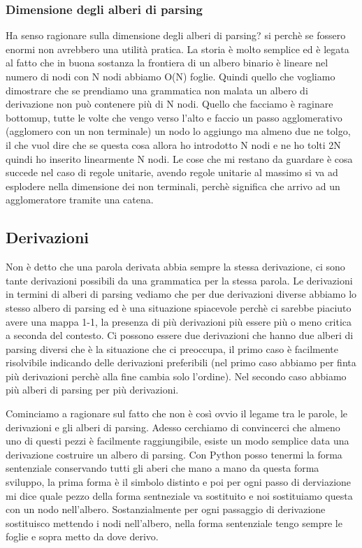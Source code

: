 \subsubsection{Dimensione degli alberi di parsing}
Ha senso ragionare sulla dimensione degli alberi di parsing? si perchè se fossero enormi non avrebbero una utilità pratica. La storia è molto semplice ed è legata al fatto che in buona sostanza la frontiera di un albero binario è lineare nel numero di nodi con N nodi abbiamo O(N) foglie. Quindi quello che vogliamo dimostrare che se prendiamo una grammatica non malata un albero di derivazione non può contenere più di N nodi.
Quello che facciamo è raginare bottomup, tutte le volte che vengo verso l'alto e faccio un passo agglomerativo (agglomero con un non terminale) un nodo lo aggiungo ma almeno due ne tolgo, il che vuol dire che se questa cosa allora ho introdotto N nodi e ne ho tolti 2N quindi ho inserito linearmente N nodi. Le cose che mi restano da guardare è cosa succede nel caso di regole unitarie, avendo regole unitarie al massimo si va ad esplodere nella dimensione dei non terminali, perchè significa che arrivo ad un agglomeratore tramite una catena.

\subsection{Derivazioni}
Non è detto che una parola derivata abbia sempre la stessa derivazione, ci sono tante derivazioni possibili da una grammatica per la stessa parola. Le derivazioni in termini di alberi di parsing vediamo che per due derivazioni diverse abbiamo lo stesso albero di parsing ed è una situazione spiacevole perchè ci sarebbe piaciuto avere una mappa 1-1, la presenza di più derivazioni più essere più o meno critica a seconda del contesto. Ci possono essere due derivazioni che hanno due alberi di parsing diversi che è la situazione che ci preoccupa, il primo caso è facilmente risolvibile indicando delle derivazioni preferibili (nel primo caso abbiamo per finta più derivazioni perchè alla fine cambia solo l'ordine).
Nel secondo caso abbiamo più alberi di parsing per più derivazioni.

Cominciamo a ragionare sul fatto che non è così ovvio il legame tra le parole, le derivazioni e gli alberi di parsing.
Adesso cerchiamo di convincerci che almeno uno di questi pezzi è facilmente raggiungibile, esiste un modo semplice data una derivazione costruire un albero di parsing. Con Python posso tenermi la forma sentenziale conservando tutti gli aberi che mano a mano da questa forma sviluppo, la prima forma è il simbolo distinto e poi per ogni passo di derviazione mi dice quale pezzo della forma sentneziale va sostituito e noi sostituiamo questa con un nodo nell'albero.
Sostanzialmente per ogni passaggio di derivazione sostituisco mettendo i nodi nell'albero, nella forma sentenziale tengo sempre le foglie e sopra metto da dove derivo.
\begin{lstlisting}
    
\end{lstlisting}

